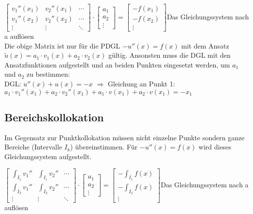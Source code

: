 $\begin{bmatrix}
		v_1''(x_1) & v_2''(x_1) & \cdots \\
		v_1''(x_2) & v_2''(x_2) & \cdots \\
		\vdots     & \vdots     & \ddots
	\end{bmatrix}\cdot
	\begin{bmatrix}
		a_1 \\
		a_2 \\
		\vdots
	\end{bmatrix}
	=\begin{bmatrix}
		-f(x_1) \\
		-f(x_2) \\
		\vdots
	\end{bmatrix}$\qquad Das Gleichungssystem nach a auflösen\\

Die obige Matrix ist nur für die PDGL $-u''(x) = f(x)$ mit dem Ansatz
$\tilde{u}(x) = a_1 \cdot v_1(x) + a_2 \cdot v_2(x)$ gültig. Ansonsten muss die
DGL mit den Ansatzfunktionen aufgestellt und an beiden Punkten eingesetzt
werden, um $a_1$ und $a_2$ zu bestimmen:\\
DGL: $u''(x) + u(x) = -x$ $\Rightarrow$ Gleichung an Punkt 1: $a_1 \cdot
	v_1''(x_1) + a_2 \cdot v_2''(x_1) + a_1 \cdot v(x_1) + a_2 \cdot v(x_1) = - x_1$




\subsection{Bereichskollokation}
Im Gegensatz zur Punktkollokation müssen nicht einzelne Punkte sondern ganze Bereiche (Intervalle $I_k$) übereinstimmen. Für $-u''(x) = f(x)$ wird dieses Gleichungssystem aufgestellt.

$\begin{bmatrix}
		\int_{I_1} v_1'' & \int_{I_1} v_2'' & \cdots \\
		\int_{I_2} v_1'' & \int_{I_2} v_2'' & \cdots \\
		\vdots           & \vdots           & \ddots
	\end{bmatrix}\cdot
	\begin{bmatrix}
		a_1 \\
		a_2 \\
		\vdots
	\end{bmatrix}
	=\begin{bmatrix}
		-\int_{I_1} f(x) \\
		-\int_{I_2} f(x) \\
		\vdots
	\end{bmatrix}$\qquad Das Gleichungssystem nach a auflösen


